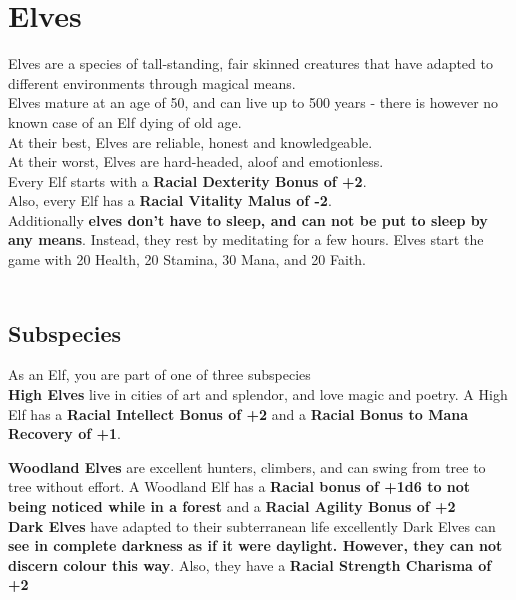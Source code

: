 \section{Elves}\label{species:elves}
Elves are a species of tall-standing, fair skinned creatures that have adapted to different environments through magical means.\\
Elves mature at an age of 50, and can live up to 500 years - there is however no known case of an Elf dying of old age.\\
At their best, Elves are reliable, honest and knowledgeable.\\
At their worst, Elves are hard-headed, aloof and emotionless.\\
Every Elf starts with a \textbf{Racial Dexterity Bonus of +2}.\\
Also, every Elf has a \textbf{Racial Vitality Malus of -2}.\\
Additionally \textbf{elves don't have to sleep, and can not be put to sleep by any means}.
Instead, they rest by meditating for a few hours.
Elves start the game with 20 Health, 20 Stamina, 30 Mana, and 20 Faith.\\
\\ 
\subsection{Subspecies}\label{subsec:elvesSub}
As an Elf, you are part of one of three subspecies\\

\textbf{High Elves} live in cities of art and splendor, and love magic and poetry.
A High Elf has a \textbf{Racial Intellect Bonus of +2} and a \textbf{Racial Bonus to Mana Recovery of +1}.

\textbf{Woodland Elves} are excellent hunters, climbers, and can swing from tree to tree without effort.
A Woodland Elf has a \textbf{Racial bonus of +1d6 to not being noticed while in a forest} and a \textbf{Racial Agility Bonus of +2}\\

\textbf{Dark Elves} have adapted to their subterranean life excellently
Dark Elves can \textbf{see in complete darkness as if it were daylight. However, they can not discern colour this way}.
Also, they have a \textbf{Racial Strength Charisma of +2}\\